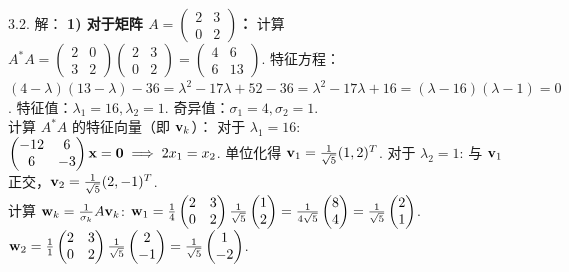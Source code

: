 \begin{exer}
3.2. 解：
\textbf{1) 对于矩阵 $A = \begin{pmatrix} 2 & 3 \\ 0 & 2 \end{pmatrix}$：}
计算 $A^*A = \begin{pmatrix} 2 & 0 \\ 3 & 2 \end{pmatrix} \begin{pmatrix} 2 & 3 \\ 0 & 2 \end{pmatrix} = \begin{pmatrix} 4 & 6 \\ 6 & 13 \end{pmatrix}$.
特征方程：$(4-\lambda)(13-\lambda) - 36 = \lambda^2 - 17\lambda + 52 - 36 = \lambda^2 - 17\lambda + 16 = (\lambda-16)(\lambda-1) = 0$.
特征值：$\lambda_1 = 16, \lambda_2 = 1$.
奇异值：$\sigma_1 = 4, \sigma_2 = 1$.
\\
计算 $A^*A$ 的特征向量（即 $\mathbf{v}_k$）：
对于 $\lambda_1 = 16$: $\begin{pmatrix} -12 & 6 \\ 6 & -3 \end{pmatrix} \mathbf{x} = \mathbf{0} \implies 2x_1 = x_2$. 单位化得 $\mathbf{v}_1 = \frac{1}{\sqrt{5}}(1, 2)^T$.
对于 $\lambda_2 = 1$: 与 $\mathbf{v}_1$ 正交，$\mathbf{v}_2 = \frac{1}{\sqrt{5}}(2, -1)^T$.
\\
计算 $\mathbf{w}_k = \frac{1}{\sigma_k} A \mathbf{v}_k$:
$\mathbf{w}_1 = \frac{1}{4} \begin{pmatrix} 2 & 3 \\ 0 & 2 \end{pmatrix} \frac{1}{\sqrt{5}} \begin{pmatrix} 1 \\ 2 \end{pmatrix} = \frac{1}{4\sqrt{5}} \begin{pmatrix} 8 \\ 4 \end{pmatrix} = \frac{1}{\sqrt{5}} \begin{pmatrix} 2 \\ 1 \end{pmatrix}$.\\
$\mathbf{w}_2 = \frac{1}{1} \begin{pmatrix} 2 & 3 \\ 0 & 2 \end{pmatrix} \frac{1}{\sqrt{5}} \begin{pmatrix} 2 \\ -1 \end{pmatrix} = \frac{1}{\sqrt{5}} \begin{pmatrix} 1 \\ -2 \end{pmatrix}$.

\end{exer}
